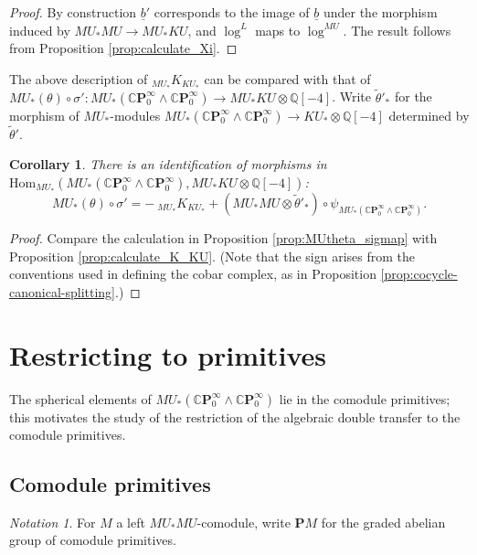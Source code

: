 \documentclass[10pt,a4paper]{amsart}
\newtheorem{cor}[thm]{Corollary}
\theoremstyle{definition}
\theoremstyle{remark}
\newtheorem{nota}[thm]{Notation}
\newcommand{\prim}{\mathbf{P}}
\renewcommand{\hom}{\mathrm{Hom}}
\newcommand{\rat}{\mathbb{Q}}
\newcommand{\cp}{\mathbb{C} \mathbf{P}^\infty}
\renewcommand{\smash}{\wedge}
\begin{document}
\begin{proof}
 By construction $\underline{b}'$ corresponds to the image of $\underline{b}$ under the morphism induced by $MU_*MU
\rightarrow MU_*KU$, and $\log^L$ maps to $\log^{MU}$. The result follows  from Proposition
\ref{prop:calculate_Xi}.
\end{proof}


The above description of $ _{MU_*} K _{KU_*}$ can be compared with that of $MU_* (\theta ) \circ \sigma ' : MU_* (\cp_0
\smash \cp_0) \rightarrow MU_*KU \otimes \rat [-4]$. Write $\tilde{\theta}'_*$ for the  morphism of $MU_*$-modules $MU_* (\cp_0 \smash \cp_0) \rightarrow KU_* \otimes \rat[-4]$ determined by  $\tilde{\theta}'$.

\begin{cor}
\label{cor:relate_MUtheta}
There is an identification of morphisms in $\hom_{MU_*} (MU_* (\cp_0\smash \cp_0), MU_*KU \otimes
\rat [-4])$:
\[
	MU_* (\theta) \circ \sigma'
	=
	-\  _{MU_*}K_{KU_*} + (MU_*MU \otimes \tilde{\theta}'_*) \circ \psi_{MU_* (\cp_0\smash \cp_0)}.
     \]
\end{cor}

\begin{proof}
Compare the calculation in Proposition \ref{prop:MUtheta_sigmap} with Proposition \ref{prop:calculate_K_KU}. (Note that the sign arises from the conventions used in defining the cobar complex, as in Proposition \ref{prop:cocycle-canonical-splitting}.)
\end{proof}



%
\section{Restricting to primitives}

The spherical elements of $MU_* (\cp_0\smash \cp_0)$ lie in the comodule primitives; this motivates the study of the restriction of the algebraic double transfer to the comodule primitives.


\subsection{Comodule primitives}

\begin{nota}
	For $M$ a left $MU_*MU$-comodule, write $\prim M$ for the graded abelian group of comodule primitives.
\end{nota}
\end{document}
